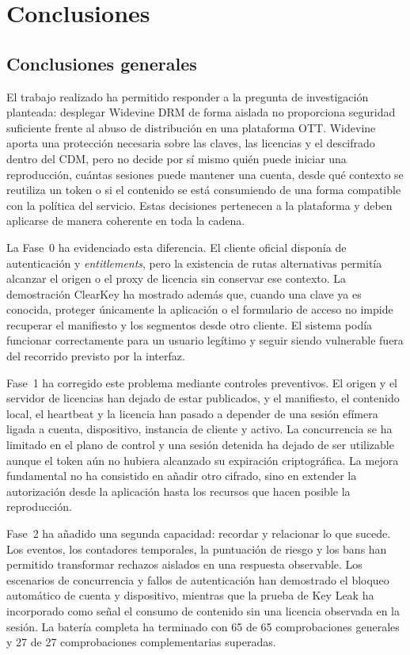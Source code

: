 
\chapter{Conclusiones}

\section{Conclusiones generales}

El trabajo realizado ha permitido responder a la pregunta de investigación planteada: desplegar Widevine DRM de forma aislada no proporciona seguridad suficiente frente al abuso de distribución en una plataforma OTT. Widevine aporta una protección necesaria sobre las claves, las licencias y el descifrado dentro del CDM, pero no decide por sí mismo quién puede iniciar una reproducción, cuántas sesiones puede mantener una cuenta, desde qué contexto se reutiliza un token o si el contenido se está consumiendo de una forma compatible con la política del servicio. Estas decisiones pertenecen a la plataforma y deben aplicarse de manera coherente en toda la cadena.

La Fase~0 ha evidenciado esta diferencia. El cliente oficial disponía de autenticación y \textit{entitlements}, pero la existencia de rutas alternativas permitía alcanzar el origen o el proxy de licencia sin conservar ese contexto. La demostración ClearKey ha mostrado además que, cuando una clave ya es conocida, proteger únicamente la aplicación o el formulario de acceso no impide recuperar el manifiesto y los segmentos desde otro cliente. El sistema podía funcionar correctamente para un usuario legítimo y seguir siendo vulnerable fuera del recorrido previsto por la interfaz.

Fase~1 ha corregido este problema mediante controles preventivos. El origen y el servidor de licencias han dejado de estar publicados, y el manifiesto, el contenido local, el heartbeat y la licencia han pasado a depender de una sesión efímera ligada a cuenta, dispositivo, instancia de cliente y activo. La concurrencia se ha limitado en el plano de control y una sesión detenida ha dejado de ser utilizable aunque el token aún no hubiera alcanzado su expiración criptográfica. La mejora fundamental no ha consistido en añadir otro cifrado, sino en extender la autorización desde la aplicación hasta los recursos que hacen posible la reproducción.

Fase~2 ha añadido una segunda capacidad: recordar y relacionar lo que sucede. Los eventos, los contadores temporales, la puntuación de riesgo y los bans han permitido transformar rechazos aislados en una respuesta observable. Los escenarios de concurrencia y fallos de autenticación han demostrado el bloqueo automático de cuenta y dispositivo, mientras que la prueba de Key Leak ha incorporado como señal el consumo de contenido sin una licencia observada en la sesión. La batería completa ha terminado con 65 de 65 comprobaciones generales y 27 de 27 comprobaciones complementarias superadas.

